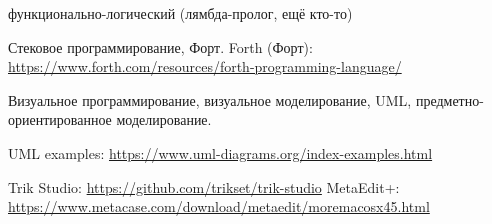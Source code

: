 функционально-логический (лямбда-пролог, ещё кто-то)

    

    Стековое программирование, Форт. 
Forth (Форт): \url{https://www.forth.com/resources/forth-programming-language/}


Визуальное программирование, визуальное моделирование, UML, предметно-ориентированное моделирование.

UML examples: \url{https://www.uml-diagrams.org/index-examples.html}

Trik Studio: \url{https://github.com/trikset/trik-studio}
MetaEdit+: \url{https://www.metacase.com/download/metaedit/moremacosx45.html}



